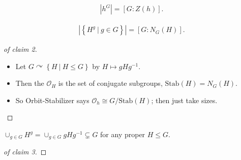 \begin{solution}

\envlist

\begin{claim}[1]

\begin{align*}
{\left\lvert {h^G} \right\rvert} = [G: Z(h)]
.\end{align*}

\end{claim}

\begin{claim}[2]

\begin{align*}
{\left\lvert {\left\{{H^g {~\mathrel{\Big|}~}g\in G}\right\}} \right\rvert} = [G: N_G(H)]
.\end{align*}

\end{claim}

\begin{proof}[of claim 2]

\envlist

\begin{itemize}
\tightlist
\item
  Let
  \(G\curvearrowright\left\{{H {~\mathrel{\Big|}~}H \leq G}\right\}\) by
  \(H \mapsto gHg^{-1}\).
\item
  Then the \(\mathcal O_H\) is the set of conjugate subgroups,
  \(\mathrm{Stab}(H) = N_G(H)\).
\item
  So Orbit-Stabilizer says \(\mathcal O_h \cong G/\mathrm{Stab}(H)\);
  then just take sizes.
\end{itemize}

\end{proof}

\begin{claim}[3]

\(\cup_{g\in G} H^g = \cup_{g\in G} gHg^{-1}\subsetneq G\) for any
proper \(H \leq G\).

\end{claim}

\begin{proof}[of claim 3]


\end{proof}
\end{solution}
